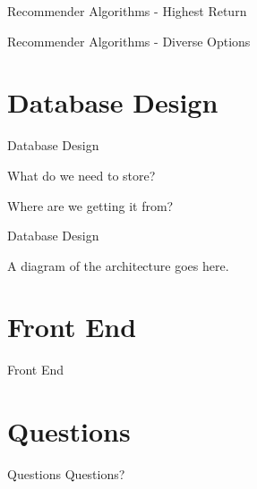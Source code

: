\documentclass{beamer}
\begin{document}
\begin{frame}{Recommender Algorithms - Highest Return}

\end{frame}

\begin{frame}{Recommender Algorithms - Diverse Options}

\end{frame}

\section{Database Design}

\begin{frame}{Database Design}

What do we need to store?

Where are we getting it from?

\end{frame}


\begin{frame}{Database Design}

A diagram of the architecture goes here.

\end{frame}

\section{Front End}

\begin{frame}{Front End}

\end{frame}

\section*{Questions}
\begin{frame}{Questions}
\centering
Questions?
\end{frame}
\end{document}
